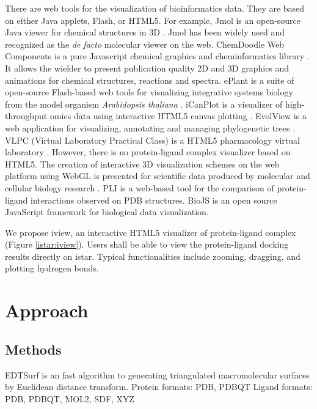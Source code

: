 \documentclass{bioinfo}
\begin{document}
There are web tools for the visualization of bioinformatics data. They are based on either Java applets, Flash, or HTML5. For example, Jmol is an open-source Java viewer for chemical structures in 3D \citep{1263}. Jmol has been widely used and recognized as the \textit{de facto} molecular viewer on the web. ChemDoodle Web Components is a pure Javascript chemical graphics and cheminformatics library \citep{1264}. It allows the wielder to present publication quality 2D and 3D graphics and animations for chemical structures, reactions and spectra.  ePlant is a suite of open-source Flash-based web tools for visualizing integrative systems biology from the model organism \textit{Arabidopsis thaliana} \citep{1242}. iCanPlot is a visualizer of high-throughput omics data using interactive HTML5 canvas plotting \citep{1028}. EvolView is a web application for visualizing, annotating and managing phylogenetic trees \citep{1241}. VLPC (Virtual Laboratory Practical Class) is a HTML5 pharmacology virtual laboratory \citep{1249}. However, there is no protein-ligand complex visualizer based on HTML5. The creation of interactive 3D visualization schemes on the web platform using WebGL is presented for scientific data produced by molecular and cellular biology research \citep{1262}. PLI \citep{1288} is a web-based tool for the comparison of protein-ligand interactions observed on PDB structures. BioJS \citep{1308} is an open source JavaScript framework for biological data visualization.

We propose iview, an interactive HTML5 visualizer of protein-ligand complex (Figure \ref{istar:iview}). Users shall be able to view the protein-ligand docking results directly on istar. Typical functionalities include zooming, dragging, and plotting hydrogen bonds.

\section{Approach}


\begin{methods}
\section{Methods}

EDTSurf \citep{1297} is an fast algorithm to generating triangulated macromolecular surfaces by Euclidean distance transform.
Protein formats: PDB, PDBQT
Ligand formats: PDB, PDBQT, MOL2, SDF, XYZ

\end{methods}
\end{document}
